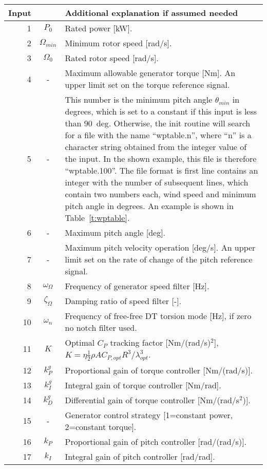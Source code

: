 \begin{table}[b]
\begin{center}
\begin{tabular}{r|c|p{11.5cm}}
Input &  & Additional explanation if assumed needed \\ \hline
1 & $P_0$ & Rated power [kW].\\
2 & $\Omega_{min}$ & Minimum rotor speed [rad/s].\\
3 & $\Omega_0$ & Rated rotor speed [rad/s]. \\
4 & -& Maximum allowable generator torque [Nm]. An upper limit set on the torque reference signal. \\
5 & -& This number is the minimum pitch angle $\theta_{min}$ in degrees, which is set to a constant if this input is less than 90~deg. Otherwise, the init routine will search for a file with the name ``wptable.n'', where ``n'' is a character string obtained from the integer value of the input. In the shown example, this file is therefore ``wptable.100''. The file format is first line contains an integer with the number of subsequent lines, which contain two numbers each, wind speed and minimum pitch angle in degrees. An example is shown in Table~\ref{t:wptable}.\\
6 & -& Maximum pitch angle [deg]. \\
7 & -& Maximum pitch velocity operation [deg/s]. An upper limit set on the rate of change of the pitch reference signal.\\
8 & $\omega_{\Omega}$ & Frequency of generator speed filter [Hz]. \\
9 & $\zeta_{\Omega}$ & Damping ratio of speed filter [-]. \\
10 & $\omega_n$ & Frequency of free-free DT torsion mode [Hz], if zero no notch filter used. \\
11 & $K$ & Optimal $C_P$ tracking factor [Nm/(rad/s)$^2$], $K=\eta \frac12 \rho A C_{P,opt} R^3/\lambda_{opt}^3$. \\
12 & $k_P^g$ & Proportional gain of torque controller [Nm/(rad/s)]. \\
13 & $k_I^g$ & Integral gain of torque controller [Nm/rad]. \\
14 & $k_D^g$ & Differential gain of torque controller [Nm/(rad/s$^2$)]. \\
15 & -& Generator control strategy [1=constant power, 2=constant torque]. \\
16 & $k_P$ & Proportional gain of pitch controller [rad/(rad/s)]. \\
17 & $k_I$ & Integral gain of pitch controller [rad/rad].\\

\end{tabular}
\end{center}
\end{table}
